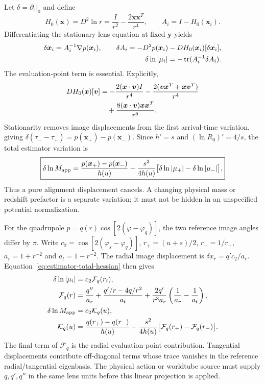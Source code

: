 Let $\delta=\partial_\epsilon|_0$ and define
\begin{equation}
 H_0(\boldsymbol x)=D^2\ln r
 =\frac{I}{r^2}-\frac{2\boldsymbol x\boldsymbol x^T}{r^4},
 \qquad A_i=I-H_0(\boldsymbol x_i).
\end{equation}
Differentiating the stationary lens equation at fixed $\boldsymbol y$ yields
\begin{align}
 \delta\boldsymbol x_i=A_i^{-1}\nabla p(\boldsymbol x_i),\qquad
 \delta A_i=-D^2p(\boldsymbol x_i)
             -DH_0(\boldsymbol x_i)[\delta\boldsymbol x_i],\notag\\
 \delta\ln|\mu_i|=-\operatorname{tr}(A_i^{-1}\delta A_i).
 \label{eq:estimator-total-hessian}
\end{align}
The evaluation-point term is essential. Explicitly,
\begin{align}
 DH_0(\boldsymbol x)[\boldsymbol v]&
 =-\frac{2(\boldsymbol x\cdot\boldsymbol v)I}{r^4}
 -\frac{2(\boldsymbol v\boldsymbol x^T+\boldsymbol x\boldsymbol v^T)}{r^4}\notag\\
 &\quad+\frac{8(\boldsymbol x\cdot\boldsymbol v)
                 \boldsymbol x\boldsymbol x^T}{r^6}.
\end{align}
Stationarity removes image displacements from the first arrival-time
variation, giving $\delta(\tau_--\tau_+)=p(\boldsymbol x_+)-p(\boldsymbol x_-)$.
Since $h'=s$ and $(\ln R_0)'=4/s$, the total estimator variation is
\begin{equation}
 \boxed{\displaystyle
 \delta\ln M_{\rm app}
 =\frac{p(\boldsymbol x_+)-p(\boldsymbol x_-)}{h(u)}
 -\frac{s^2}{4h(u)}
 \bigl[\delta\ln|\mu_+|-\delta\ln|\mu_-|\bigr].}
 \label{eq:estimator-general-variation}
\end{equation}
Thus a pure alignment displacement cancels. A changing physical mass or
redshift prefactor is a separate variation; it must not be hidden in an
unspecified potential normalization.

For the quadrupole $p=q(r)\cos[2(\varphi-\varphi_q)]$, the two reference
image angles differ by $\pi$. Write
$c_2=\cos[2(\varphi_s-\varphi_q)]$, $r_+=(u+s)/2$, $r_-=1/r_+$,
$a_r=1+r^{-2}$ and $a_t=1-r^{-2}$. The radial image displacement is
$\delta x_r=q'c_2/a_r$. Equation~\eqref{eq:estimator-total-hessian} then gives
\begin{align}
 \delta\ln|\mu_i|&=c_2\mathcal F_q(r_i),\\
 \mathcal F_q(r)&=
 \frac{q''}{a_r}+\frac{q'/r-4q/r^2}{a_t}
 +\frac{2q'}{r^3a_r}\left(\frac1{a_r}-\frac1{a_t}\right),
 \label{eq:estimator-Fq}\\
 \delta\ln M_{\rm app}&=c_2\mathcal K_q(u),\\
 \mathcal K_q(u)&=
 \frac{q(r_+)-q(r_-)}{h(u)}
 -\frac{s^2}{4h(u)}\bigl[\mathcal F_q(r_+)-\mathcal F_q(r_-)\bigr].
 \label{eq:estimator-Kq}
\end{align}
The final term of $\mathcal F_q$ is the radial evaluation-point contribution.
Tangential displacements contribute off-diagonal terms whose trace vanishes
in the reference radial/tangential eigenbasis. The physical action or
worldtube source must supply $q,q',q''$ in the same lens units before this
linear projection is applied.

